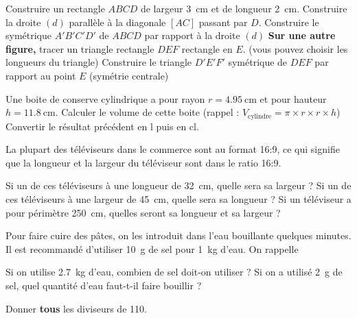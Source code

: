 \documentclass[../Cours.tex]{subfiles}
\begin{document}
\clearpage
\thispagestyle{empty}

\setcounter{DS}{2}

\color{black}
\nomPrenom
\titreDS

\begin{questions}
    \question Construire un rectangle $ABCD$ de largeur \qty{3}{\centi\metre} et de longueur \qty{2}{\centi\metre}.
    \question Construire la droite $(d)$ parallèle à la diagonale $[AC]$ passant par $D$.
    \question Construire le symétrique $A'B'C'D'$ de $ABCD$ par rapport à la droite $(d)$
    \question \textbf{Sur une autre figure,} tracer un triangle rectangle $DEF$ rectangle en $E$. (vous pouvez choisir les longueurs du triangle)
    \question Construire le triangle $D'E'F'$ symétrique de $DEF$ par rapport au point $E$ (symétrie centrale)
    
    Une boite de conserve cylindrique a pour rayon $r=\qty{4.95}{\centi\metre}$ et pour hauteur $h=\qty{11.8}{\centi\metre}$.
    \question Calculer le volume de cette boite (rappel : $V_{\mbox{cylindre}} = \pi \times r \times r \times h$)
    \question Convertir le résultat précédent en \unit{\litre} puis en \unit{\centi\litre}.

    La plupart des téléviseurs dans le commerce sont au format 16:9, ce qui signifie que la longueur et la largeur du téléviseur sont dans le ratio 16:9.

    \question Si un de ces téléviseurs à une longueur de \qty{32}{\centi\metre}, quelle sera sa largeur ?
    \question Si un de ces téléviseurs à une largeur de \qty{45}{\centi\metre}, quelle sera sa longueur ?
    \question Si un téléviseur a pour périmètre \qty{250}{\centi\metre}, quelles seront sa longueur et sa largeur ?

    Pour faire cuire des pâtes, on les introduit dans l'eau bouillante quelques minutes. Il est recommandé d'utiliser \qty{10}{\gram} de sel pour \qty{1}{\kilo\gram} d'eau. On rappelle

    \question Si on utilise \qty{2.7}{\kilo\gram} d'eau, combien de sel doit-on utiliser ?
    \question Si on a utilisé \qty{2}{\gram} de sel, quel quantité d'eau faut-t-il faire bouillir ?


    \question Donner \textbf{tous} les diviseurs de 110.
        
    
\end{questions}
\end{document}
